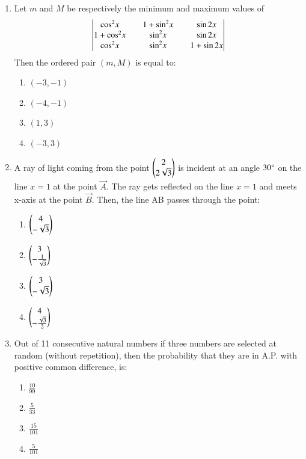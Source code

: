\documentclass[journal]{IEEEtran}
\theoremstyle{remark}
\begin{document}
\begin{enumerate}
\item  Let $m$ and $M$ be respectively the minimum and maximum values of 
\begin{align*}
    \begin{vmatrix}{\cos}^2x && 1+{\sin}^2x && \sin2x \\1+{\cos}^2x && {\sin}^2x && \sin2x \\ {\cos}^2x && {\sin}^2x && 1+\sin2x\end{vmatrix}
\end{align*}
Then the ordered pair $(m, M)$ is equal to:\hfill{}
\begin{multicols}{4}
\begin{enumerate}
\item $(-3, -1)$
\item $(-4, -1)$
\item $(1, 3)$
\item $(-3, 3)$
\end{enumerate}
\end{multicols}

\item  A ray of light coming from the point $\begin{pmatrix}2\\ 2\sqrt{3}\end{pmatrix}$ is incident at an angle $30\degree$ on the line $x = 1$ at the point $\vec{A}$. The ray gets reflected on the line $x = 1$ and meets x-axis at the point $\vec{B}$. Then, the line AB passes through the point:\hfill{}
\begin{multicols}{4}
\begin{enumerate}
\item $\begin{pmatrix}4 \\ -\sqrt{3}\end{pmatrix}$
\item $\begin{pmatrix}3 \\ -\frac{1}{\sqrt{3}}\end{pmatrix}$
\item $\begin{pmatrix}3 \\ -\sqrt{3}\end{pmatrix}$
\item $\begin{pmatrix}4 \\ -\frac{\sqrt{3}}{2}\end{pmatrix}$
\end{enumerate}
\end{multicols}

\item Out of 11 consecutive natural numbers if three numbers are selected at random (without repetition), then the probability that they are in A.P. with positive common difference, is:\hfill{}

\begin{multicols}{4}
\begin{enumerate}
\item $\frac{10}{99}$
\item $\frac{5}{33}$
\item $\frac{15}{101}$
\item $\frac{5}{101}$
\end{enumerate}
\end{multicols}


\end{enumerate}
\end{document}
